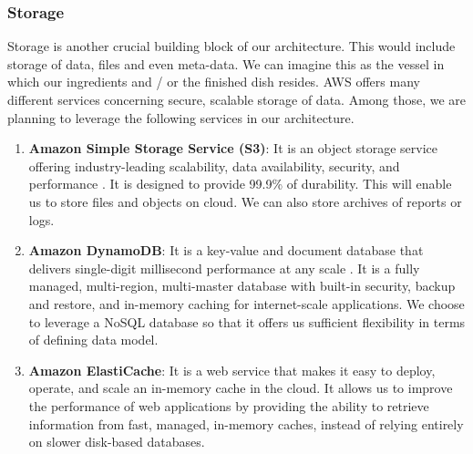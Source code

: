 \documentclass{article}
\begin{document}
\subsubsection{Storage}
Storage is another crucial building block of our architecture. This would include storage of data, files and even meta-data. We can imagine this as the vessel in which our ingredients and / or the finished dish resides. AWS offers many different services concerning secure, scalable storage of data. Among those, we are planning to leverage the following services in our architecture. 
\begin{enumerate}
    \item \textbf{Amazon Simple Storage Service (S3)}: It is an object storage service offering industry-leading scalability, data availability, security, and performance \cite{s3}. It is designed to provide 99.9\% of durability. This will enable us to store files and objects on cloud. We can also store archives of reports or logs. 
    \item \textbf{Amazon DynamoDB}: It is a key-value and document database that delivers single-digit millisecond performance at any scale \cite{dynamo}. It is a fully managed, multi-region, multi-master database with built-in security, backup and restore, and in-memory caching for internet-scale applications. We choose to leverage a NoSQL database so that it offers us sufficient flexibility in terms of defining data model. 
    \item \textbf{Amazon ElastiCache}: It is a web service that makes it easy to deploy, operate, and scale an in-memory cache in the cloud. It allows us to improve the performance of web applications by providing the ability to retrieve information from fast, managed, in-memory caches, instead of relying entirely on slower disk-based databases. 
\end{enumerate}
\end{document}
